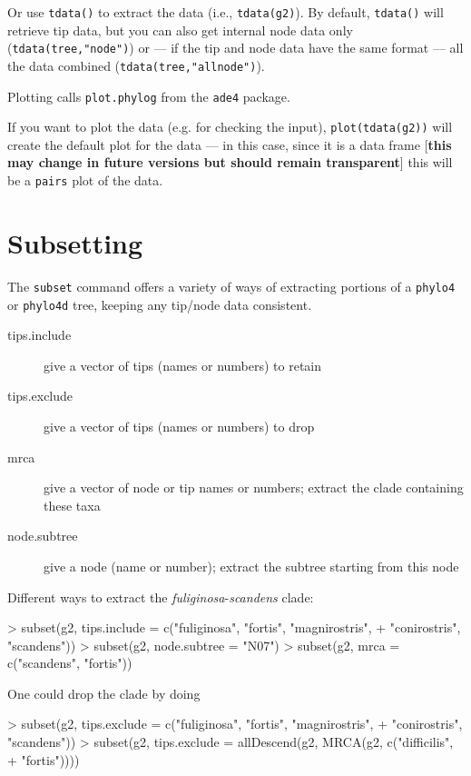 \documentclass{article}
\newcommand{\code}[1]{{{\tt #1}}}
\begin{document}
Or use \code{tdata()} to extract the data (i.e., \code{tdata(g2)}). By default, \code{tdata()} will retrieve tip data, but you can also get internal node data only (\code{tdata(tree,"node")}) or --- if the tip and node data have the same format --- all the data combined (\code{tdata(tree,"allnode")}).

Plotting calls \code{plot.phylog} from the \code{ade4} package.

If you want to plot the data (e.g. for checking the input), \code{plot(tdata(g2))} will create the default plot for the data --- in this case, since it is a data frame [\textbf{this may change in future versions but should remain transparent}] this will be a \code{pairs} plot of the data.

\section{Subsetting}

The \code{subset} command offers a variety of ways of extracting portions of a \code{phylo4} or \code{phylo4d} tree, keeping any tip/node data consistent.

\begin{description}
\item[tips.include]{give a vector of tips (names or numbers) to retain}
\item[tips.exclude]{give a vector of tips (names or numbers) to drop}
\item[mrca]{give a vector of node or tip names or numbers; extract the clade containing these taxa}
\item[node.subtree]{give a node (name or number); extract the subtree starting from this node}
\end{description}

Different ways to extract the \emph{fuliginosa}-\emph{scandens}
clade:
\begin{Schunk}
\begin{Sinput}
> subset(g2, tips.include = c("fuliginosa", "fortis", "magnirostris", 
+     "conirostris", "scandens"))
> subset(g2, node.subtree = "N07")
> subset(g2, mrca = c("scandens", "fortis"))
\end{Sinput}
\end{Schunk}

One could drop the clade by  doing
\begin{Schunk}
\begin{Sinput}
> subset(g2, tips.exclude = c("fuliginosa", "fortis", "magnirostris", 
+     "conirostris", "scandens"))
> subset(g2, tips.exclude = allDescend(g2, MRCA(g2, c("difficilis", 
+     "fortis"))))
\end{Sinput}
\end{Schunk}
\end{document}
